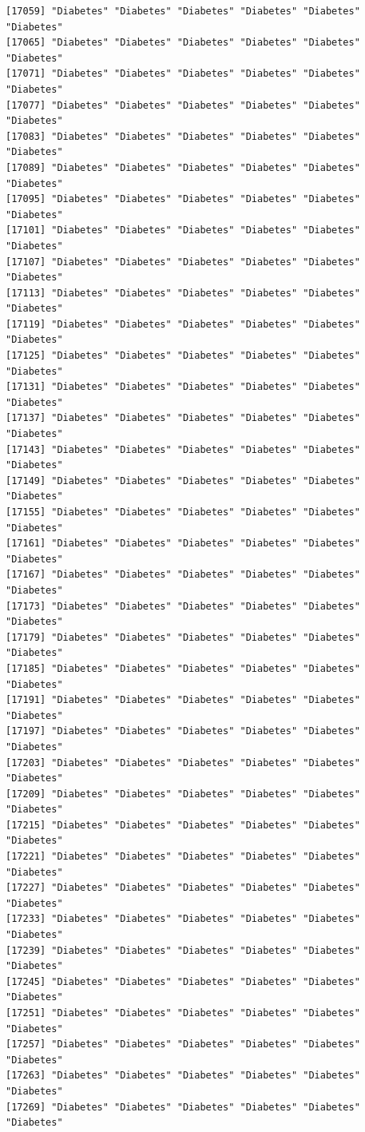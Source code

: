 \documentclass[
  letterpaper,
  DIV=11,
  numbers=noendperiod]{scrartcl}
\begin{document}
\begin{verbatim}
[17059] "Diabetes" "Diabetes" "Diabetes" "Diabetes" "Diabetes" "Diabetes"
[17065] "Diabetes" "Diabetes" "Diabetes" "Diabetes" "Diabetes" "Diabetes"
[17071] "Diabetes" "Diabetes" "Diabetes" "Diabetes" "Diabetes" "Diabetes"
[17077] "Diabetes" "Diabetes" "Diabetes" "Diabetes" "Diabetes" "Diabetes"
[17083] "Diabetes" "Diabetes" "Diabetes" "Diabetes" "Diabetes" "Diabetes"
[17089] "Diabetes" "Diabetes" "Diabetes" "Diabetes" "Diabetes" "Diabetes"
[17095] "Diabetes" "Diabetes" "Diabetes" "Diabetes" "Diabetes" "Diabetes"
[17101] "Diabetes" "Diabetes" "Diabetes" "Diabetes" "Diabetes" "Diabetes"
[17107] "Diabetes" "Diabetes" "Diabetes" "Diabetes" "Diabetes" "Diabetes"
[17113] "Diabetes" "Diabetes" "Diabetes" "Diabetes" "Diabetes" "Diabetes"
[17119] "Diabetes" "Diabetes" "Diabetes" "Diabetes" "Diabetes" "Diabetes"
[17125] "Diabetes" "Diabetes" "Diabetes" "Diabetes" "Diabetes" "Diabetes"
[17131] "Diabetes" "Diabetes" "Diabetes" "Diabetes" "Diabetes" "Diabetes"
[17137] "Diabetes" "Diabetes" "Diabetes" "Diabetes" "Diabetes" "Diabetes"
[17143] "Diabetes" "Diabetes" "Diabetes" "Diabetes" "Diabetes" "Diabetes"
[17149] "Diabetes" "Diabetes" "Diabetes" "Diabetes" "Diabetes" "Diabetes"
[17155] "Diabetes" "Diabetes" "Diabetes" "Diabetes" "Diabetes" "Diabetes"
[17161] "Diabetes" "Diabetes" "Diabetes" "Diabetes" "Diabetes" "Diabetes"
[17167] "Diabetes" "Diabetes" "Diabetes" "Diabetes" "Diabetes" "Diabetes"
[17173] "Diabetes" "Diabetes" "Diabetes" "Diabetes" "Diabetes" "Diabetes"
[17179] "Diabetes" "Diabetes" "Diabetes" "Diabetes" "Diabetes" "Diabetes"
[17185] "Diabetes" "Diabetes" "Diabetes" "Diabetes" "Diabetes" "Diabetes"
[17191] "Diabetes" "Diabetes" "Diabetes" "Diabetes" "Diabetes" "Diabetes"
[17197] "Diabetes" "Diabetes" "Diabetes" "Diabetes" "Diabetes" "Diabetes"
[17203] "Diabetes" "Diabetes" "Diabetes" "Diabetes" "Diabetes" "Diabetes"
[17209] "Diabetes" "Diabetes" "Diabetes" "Diabetes" "Diabetes" "Diabetes"
[17215] "Diabetes" "Diabetes" "Diabetes" "Diabetes" "Diabetes" "Diabetes"
[17221] "Diabetes" "Diabetes" "Diabetes" "Diabetes" "Diabetes" "Diabetes"
[17227] "Diabetes" "Diabetes" "Diabetes" "Diabetes" "Diabetes" "Diabetes"
[17233] "Diabetes" "Diabetes" "Diabetes" "Diabetes" "Diabetes" "Diabetes"
[17239] "Diabetes" "Diabetes" "Diabetes" "Diabetes" "Diabetes" "Diabetes"
[17245] "Diabetes" "Diabetes" "Diabetes" "Diabetes" "Diabetes" "Diabetes"
[17251] "Diabetes" "Diabetes" "Diabetes" "Diabetes" "Diabetes" "Diabetes"
[17257] "Diabetes" "Diabetes" "Diabetes" "Diabetes" "Diabetes" "Diabetes"
[17263] "Diabetes" "Diabetes" "Diabetes" "Diabetes" "Diabetes" "Diabetes"
[17269] "Diabetes" "Diabetes" "Diabetes" "Diabetes" "Diabetes" "Diabetes"

\end{verbatim}
\end{document}
